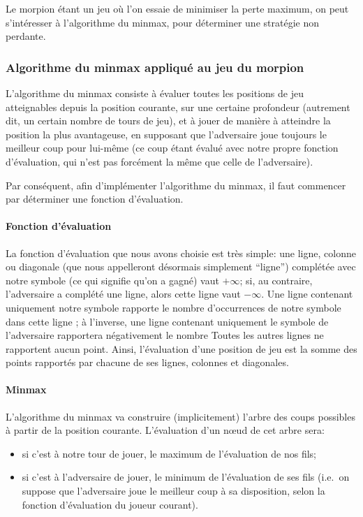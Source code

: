 Le morpion étant un jeu où l'on essaie de minimiser la perte maximum,
on peut s'intéresser à l'algorithme du minmax, pour déterminer une
stratégie non perdante.

\subsubsection{Algorithme du minmax appliqué au jeu du morpion}
L'algorithme du minmax consiste à évaluer toutes les positions de jeu
atteignables depuis la position courante, sur une certaine profondeur
(autrement dit, un certain nombre de tours de jeu), et à jouer de
manière à atteindre la position la plus avantageuse, en supposant que
l'adversaire joue toujours le meilleur coup pour lui-même (ce coup
étant évalué avec notre propre fonction d'évaluation, qui n'est pas
forcément la même que celle de l'adversaire).

Par conséquent, afin d'implémenter l'algorithme du minmax, il faut
commencer par déterminer une fonction d'évaluation.

\paragraph{Fonction d'évaluation}
La fonction d'évaluation que nous avons choisie est très simple: une
ligne, colonne ou diagonale (que nous appelleront désormais simplement
``ligne'') complétée avec notre symbole (ce qui signifie qu'on a
gagné) vaut $+\infty$; si, au contraire, l'adversaire a complété une
ligne, alors cette ligne vaut $-\infty$. Une ligne contenant
uniquement notre symbole rapporte le nombre d'occurrences de notre
symbole dans cette ligne ; à l'inverse, une ligne contenant uniquement
le symbole de l'adversaire rapportera négativement le nombre
Toutes les autres lignes ne rapportent aucun point.
Ainsi, l'évaluation d'une position de jeu est la somme des points
rapportés par chacune de ses lignes, colonnes et diagonales.

\paragraph{Minmax}
L'algorithme du minmax va construire (implicitement) l'arbre des coups
possibles à partir de la position courante.
L'évaluation d'un nœud de cet arbre sera:
\begin{itemize}
  \item si c'est à notre tour de jouer, le maximum de l'évaluation de nos fils;
  \item si c'est à l'adversaire de jouer, le minimum de l'évaluation
    de ses fils (i.e.\ on suppose que l'adversaire joue le meilleur
    coup à sa disposition, selon la fonction d'évaluation du joueur courant).
\end{itemize}

